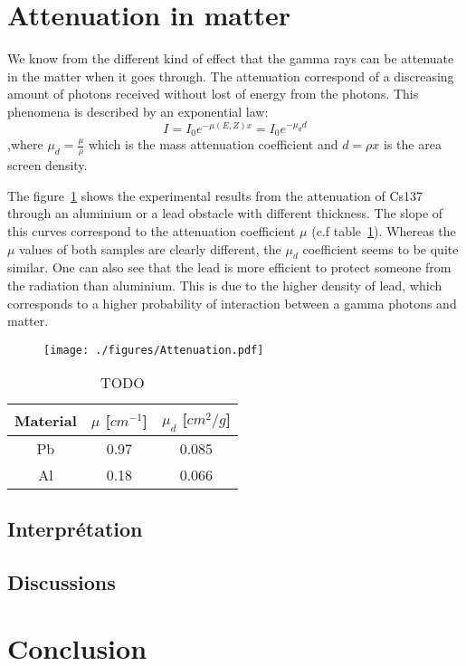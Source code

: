 \documentclass[a4paper,12pt,oneside]{article}
\begin{document}

\section{Attenuation in matter}%
We know from the different kind of effect that the gamma rays can be attenuate in the matter when it goes through. The attenuation correspond of a discreasing amount of photons received without lost of energy from the photons.
This phenomena is described by an exponential law:
$$I=I_0e^{-\mu(E,Z)x}=I_0 e^{-\mu_d d}$$
,where $\mu_d=\frac{\mu}{\rho}$ which is the mass attenuation coefficient and $d=\rho x$ is the area screen density.

The figure~\ref{fig:attenuation} shows the experimental results from the attenuation of Cs137 through an aluminium or a lead obstacle with different thickness. The slope of this curves correspond to the attenuation coefficient $\mu$ (c.f table~\ref{tab:attenuation}).
Whereas the $\mu$ values of both samples are clearly different, the $\mu_d$ coefficient seems to be quite similar. One can also see that the lead is more efficient to protect someone from the radiation than aluminium. This is due to the higher density of lead, which corresponds to a higher probability of interaction between a gamma photons and matter.%


\begin{figure}[H]
  \begin{center}
  \texttt{[image: ./figures/Attenuation.pdf]}
  \caption{} \label{fig:attenuation}
  \end{center}
\end{figure}

\begin{table}[H]
\centering
	\begin{tabular}{|c|c|c|}
	   \hline
		Material & $\mu$ [$cm^{-1}$] & $\mu_d$ [$cm^2/g$]\\
		\hline
		Pb	& 0.97 & 0.085 \\
		Al	& 0.18 & 0.066 \\
	   	\hline
	\end{tabular}
	\caption{TODO}
	\label{tab:attenuation}
\end{table}

\subsection{Interprétation}

\subsection{Discussions}
\section{Conclusion}






\begin{thebibliography}{99}
\end{thebibliography}
\end{document}
